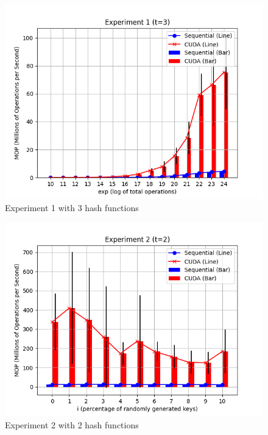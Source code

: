\documentclass{article}
\begin{document}
\begin{figure}[h!]
    \centering
    \includegraphics[width=\textwidth]{../figs/experiment1_t3.png}
    \caption{Experiment 1 with 3 hash functions}
\end{figure}

\begin{figure}[h!]
    \centering
    \includegraphics[width=\textwidth]{../figs/experiment2_t2.png}
    \caption{Experiment 2 with 2 hash functions}
\end{figure}
\end{document}
